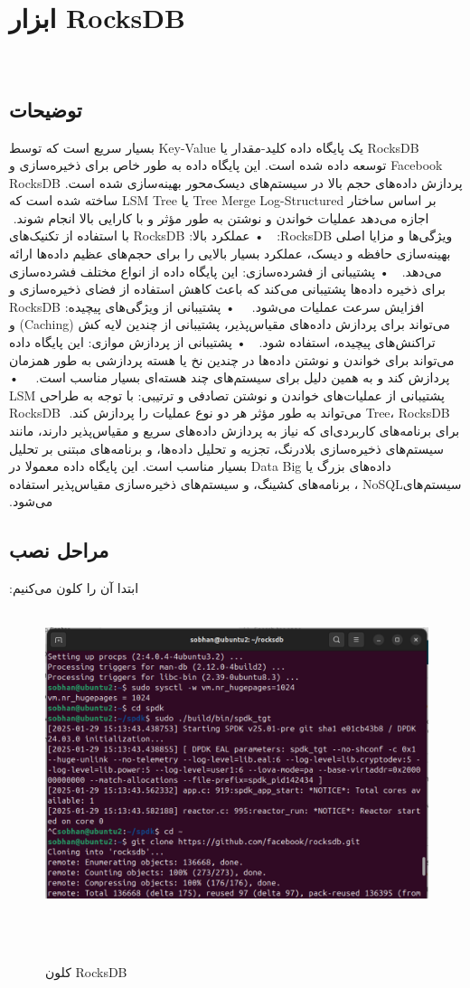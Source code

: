 ‫‫\section{ابزار RocksDB}
‫\subsection*{توضیحات}
‫RocksDB یک پایگاه داده کلید-مقدار یا Key-Value  بسیار سریع است که توسط Facebook توسعه داده شده است. این پایگاه داده به طور خاص برای ذخیره‌سازی و پردازش داده‌های حجم بالا در سیستم‌های دیسک‌محور بهینه‌سازی شده است. RocksDB بر اساس ساختار Tree Merge Log-Structured یا LSM Tree ساخته شده است که اجازه می‌دهد عملیات خواندن و نوشتن به طور مؤثر و با کارایی بالا انجام شوند.
‫
‫ویژگی‌ها و مزایا اصلی RocksDB:
‫
‫    • عملکرد بالا: RocksDB با استفاده از تکنیک‌های بهینه‌سازی حافظه و دیسک، عملکرد بسیار بالایی را برای حجم‌های عظیم داده‌ها ارائه می‌دهد.
‫
‫    • پشتیبانی از فشرده‌سازی: این پایگاه داده از انواع مختلف فشرده‌سازی برای ذخیره داده‌ها پشتیبانی می‌کند که باعث کاهش استفاده از فضای ذخیره‌سازی و افزایش سرعت عملیات می‌شود.
‫
‫
‫    • پشتیبانی از ویژگی‌های پیچیده: RocksDB می‌تواند برای پردازش داده‌های مقیاس‌پذیر، پشتیبانی از چندین لایه کش (Caching) و تراکنش‌های پیچیده، استفاده شود.
‫
‫    • پشتیبانی از پردازش موازی: این پایگاه داده می‌تواند برای خواندن و نوشتن داده‌ها در چندین نخ یا هسته پردازشی به طور همزمان پردازش کند و به همین دلیل برای سیستم‌های چند هسته‌ای بسیار مناسب است.
‫
‫
‫    • پشتیبانی از عملیات‌های خواندن و نوشتن تصادفی و ترتیبی: با توجه به طراحی LSM Tree، RocksDB می‌تواند به طور مؤثر هر دو نوع عملیات را پردازش کند.
‫
‫RocksDB برای برنامه‌های کاربردی‌ای که نیاز به پردازش داده‌های سریع و مقیاس‌پذیر دارند، مانند سیستم‌های ذخیره‌سازی بلادرنگ، تجزیه و تحلیل داده‌ها، و برنامه‌های مبتنی بر تحلیل داده‌های بزرگ یا Data Big بسیار مناسب است. این پایگاه داده معمولا در سیستم‌هایNoSQL ، برنامه‌های کشینگ، و سیستم‌های ذخیره‌سازی مقیاس‌پذیر استفاده می‌شود.
‫‫\subsection*{مراحل نصب}
‫ابتدا آن را کلون می‌کنیم:
‫
‫\begin{figure}[H]
‫    \centering
‫    \includegraphics[width=\textwidth]{figs/1.png}
‫    \caption{کلون RocksDB}
‫\end{figure}
